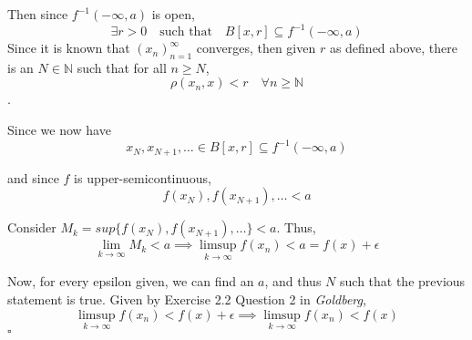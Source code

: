 \documentclass[11pt]{article}
\begin{document}
\begin{enumerate}
Then since \(f^{-1}(-\infty, a)\) is open,
\[
   \exists r > 0 \quad \text{such that} \quad B[x, r] \subseteq f^{-1}(-\infty, a)
   \]
Since it is known that \((x_n)^\infty_{n=1}\) converges, then given \(r\) as
defined above, there is an \(N \in \mathbb{N}\) such that for all \(n \geq
   N\),
\[
   \rho(x_n, x) < r \quad \forall n \geq \mathbb{N}
   \].

Since we now have
\[
   x_N, x_{N+1}, \dots \in B[x,r] \subseteq f^{-1}(-\infty, a)
   \]

and since \(f\) is upper-semicontinuous,
\[
   f(x_N), f(x_{N+1}), \dots < a
   \]

Consider \(M_k = sup\{f(x_N), f(x_{N+1}), \dots \} < a\). Thus,
\[
   \lim_{k \rightarrow \infty} M_k < a \implies
   \limsup_{k \rightarrow \infty} f(x_n) < a = f(x) + \epsilon
   \]

Now, for every epsilon given, we can find an \(a\), and thus \(N\) such that
the previous statement is true. Given by Exercise 2.2 Question 2 in
\emph{Goldberg},
\[
   \limsup_{k \rightarrow \infty} f(x_n) < f(x) + \epsilon
   \implies
   \limsup_{k \rightarrow \infty} f(x_n) < f(x)
   \]
\(\square\)
\end{enumerate}
\end{document}
